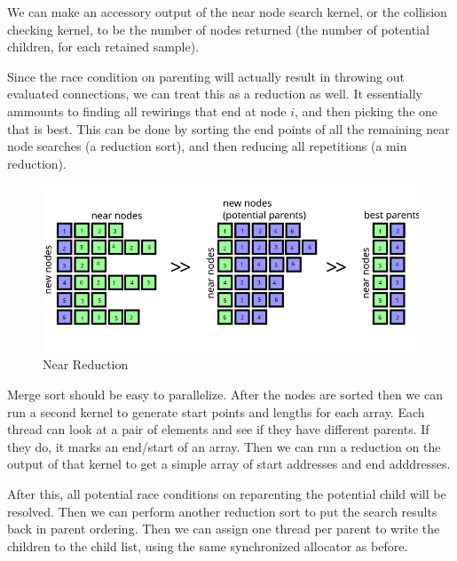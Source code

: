 We can make an accessory output of the near node search kernel, or the collision checking kernel, to be the number of nodes returned (the number of potential children, for each retained sample). 

Since the race condition on parenting will actually result in throwing out evaluated connections, we can treat this as a reduction as well. It essentially ammounts to finding all rewirings that end at node $i$, and then picking the one that is best. This can be done by sorting the end points of all the remaining near node searches (a reduction sort), and then reducing all repetitions (a min reduction). 
 
\begin{figure}[H]
\begin{centering}
    \includegraphics[scale=1]{fig/kernel_near_rotate}
    \caption{Near Reduction}
\end{centering} 
\end{figure}

Merge sort should be easy to parallelize. After the nodes are sorted then we can run a second kernel to generate start points and lengths for each array. Each thread can look at a pair of elements and see if they have different parents. If they do, it marks an end/start of an array. Then we can run a reduction on the output of that kernel to get a simple array of start addresses and end adddresses. 

After this, all potential race conditions on reparenting the potential child will be resolved. Then we can perform another reduction sort to put the search results back in parent ordering. Then we can assign one thread per parent to write the children to the child list, using the same synchronized allocator as before. 
 
